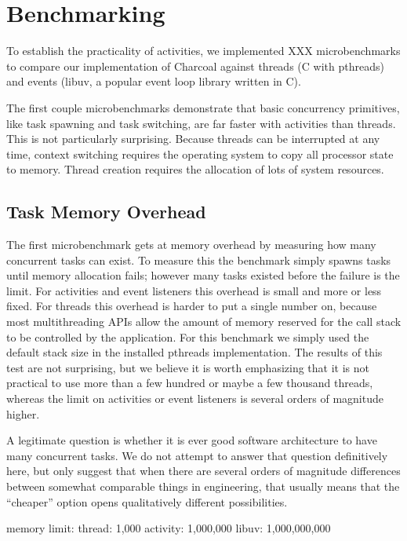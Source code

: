 \documentclass[10pt,preprint]{sigplanconf}
\begin{document}
\section{Benchmarking}

To establish the practicality of activities, we implemented XXX microbenchmarks to compare our implementation of Charcoal against threads (C with pthreads) and events (libuv, a popular event loop library written in C).

The first couple microbenchmarks demonstrate that basic concurrency primitives, like task spawning and task switching, are far faster with activities than threads.
This is not particularly surprising.
Because threads can be interrupted at any time, context switching requires the operating system to copy all processor state to memory.
Thread creation requires the allocation of lots of system resources.

\subsection{Task Memory Overhead}

The first microbenchmark gets at memory overhead by measuring how many concurrent tasks can exist.
To measure this the benchmark simply spawns tasks until memory allocation fails; however many tasks existed before the failure is the limit.
For activities and event listeners this overhead is small and more or less fixed.
For threads this overhead is harder to put a single number on, because most multithreading APIs allow the amount of memory reserved for the call stack to be controlled by the application.
For this benchmark we simply used the default stack size in the installed pthreads implementation.
The results of this test are not surprising, but we believe it is worth emphasizing that it is not practical to use more than a few hundred or maybe a few thousand threads, whereas the limit on activities or event listeners is several orders of magnitude higher.

A legitimate question is whether it is ever good software architecture to have many concurrent tasks.
We do not attempt to answer that question definitively here, but only suggest that when there are several orders of magnitude differences between somewhat comparable things in engineering, that usually means that the ``cheaper'' option opens qualitatively different possibilities.

memory limit: thread: 1,000 activity: 1,000,000 libuv: 1,000,000,000
\end{document}
